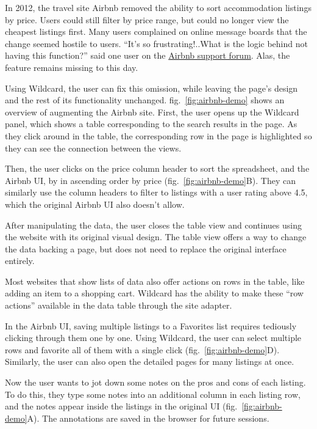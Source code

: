 \documentclass[english,submission]{programming}
\begin{document}
In 2012, the travel site Airbnb removed the ability to sort
accommodation listings by price. Users could still filter by price
range, but could no longer view the cheapest listings first. Many users
complained on online message boards that the change seemed hostile to
users. ``It's so frustrating!..What is the logic behind not having this
function?'' said one user on the
\href{https://community.withairbnb.com/t5/Hosting/Sorting-listing-by-price/td-p/559404}{Airbnb
support forum}. Alas, the feature remains missing to this day.

Using Wildcard, the user can fix this omission, while leaving the page's
design and the rest of its functionality unchanged.{
fig.~\ref{fig:airbnb-demo} shows an overview of augmenting the Airbnb
site.} First, the user opens up the Wildcard panel, which shows a table
corresponding to the search results in the page. As they click around in
the table, the corresponding row in the page is highlighted so they can
see the connection between the views.

Then, the user clicks on the price column header to sort the
spreadsheet, and the Airbnb UI, by in ascending order by price{
(fig.~\ref{fig:airbnb-demo}B)}. They can similarly use the column
headers to filter to listings with a user rating above 4.5, which the
original Airbnb UI also doesn't allow.

After manipulating the data, the user closes the table view and
continues using the website with its original visual design. The table
view offers a way to change the data backing a page, but does not need
to replace the original interface entirely.

Most websites that show lists of data also offer actions on rows in the
table, like adding an item to a shopping cart. Wildcard has the ability
to make these ``row actions'' available in the data table through the
site adapter.

In the Airbnb UI, saving multiple listings to a Favorites list requires
tediously clicking through them one by one. Using Wildcard, the user can
select multiple rows and favorite all of them with a single click{
(fig.~\ref{fig:airbnb-demo}D)}. Similarly, the user can also open the
detailed pages for many listings at once.

Now the user wants to jot down some notes on the pros and cons of each
listing. To do this, they type some notes into an additional column in
each listing row, and the notes appear inside the listings in the
original UI{ (fig.~\ref{fig:airbnb-demo}A)}. The annotations are saved
in the browser for future sessions.
\end{document}
